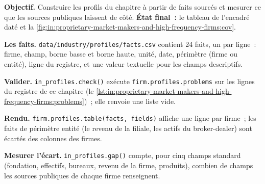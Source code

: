\begin{tutorial}
\textbf{Objectif.} Construire les profils du chapitre à partir de faits sourcés et mesurer ce que les sources publiques laissent de côté.
\textbf{État final~:} le tableau de l'encadré daté et la \cref{fig:in:proprietary-market-makers-and-high-frequency-firms:cov}.
\begin{tutsteps}
\item \textbf{Les faits.} \texttt{data/industry/profiles/facts.csv} contient 24 faits, un par ligne~: firme, champ, borne basse et
borne haute, unité, date, périmètre (firme ou entité), ligne du registre, et une valeur textuelle pour les champs descriptifs.
\item \textbf{Valider.} \texttt{in\_profiles.check()} exécute \texttt{firm.profiles.problems} sur les lignes du registre de
ce chapitre (le \cref{lst:in:proprietary-market-makers-and-high-frequency-firms:problems})~; elle renvoie une liste vide.
\label{lst:in:proprietary-market-makers-and-high-frequency-firms:problems}
\item \textbf{Rendu.} \texttt{firm.profiles.table(facts, fields)} affiche une ligne par firme~; les faits de périmètre entité (le
revenu de la filiale, les actifs du broker-dealer) sont écartés des colonnes des firmes.
\item \textbf{Mesurer l'écart.} \texttt{in\_profiles.gap()} compte, pour cinq champs standard (fondation, effectifs,
bureaux, revenu de la firme, produits), combien de champs les sources publiques de chaque firme renseignent.
\end{tutsteps}
\end{tutorial}

